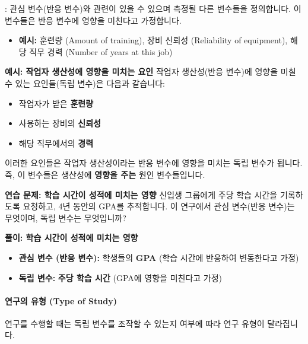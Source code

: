 \documentclass[11pt,a4paper]{article}
\begin{document}
\begin{tcolorbox}[mybox, title={연구 시작의 두 번째 단계: 독립 변수 정의 (Step Two in Initiating a Study)}]
: 관심 변수(반응 변수)와 관련이 있을 수 있으며 측정될 다른 변수들을 정의합니다. 이 변수들은 반응 변수에 영향을 미친다고 가정합니다.
\begin{itemize}
    \item \textbf{예시:} 훈련량 (Amount of training), 장비 신뢰성 (Reliability of equipment), 해당 직무 경력 (Number of years at this job)
\end{itemize}
\end{tcolorbox}

\begin{examplebox}
\textbf{예시: 작업자 생산성에 영향을 미치는 요인}
작업자 생산성(반응 변수)에 영향을 미칠 수 있는 요인들(독립 변수)은 다음과 같습니다:
\begin{itemize}
    \item 작업자가 받은 \textbf{훈련량}
    \item 사용하는 장비의 \textbf{신뢰성}
    \item 해당 직무에서의 \textbf{경력}
\end{itemize}
이러한 요인들은 작업자 생산성이라는 반응 변수에 영향을 미치는 독립 변수가 됩니다. 즉, 이 변수들은 생산성에 \textbf{영향을 주는} 원인 변수들입니다.
\end{examplebox}

\begin{practicebox}
\textbf{연습 문제: 학습 시간이 성적에 미치는 영향}
신입생 그룹에게 주당 학습 시간을 기록하도록 요청하고, 4년 동안의 GPA를 추적합니다.
이 연구에서 관심 변수(반응 변수)는 무엇이며, 독립 변수는 무엇입니까?
\end{practicebox}

\begin{solutionbox}
\textbf{풀이: 학습 시간이 성적에 미치는 영향}
\begin{itemize}
    \item \textbf{관심 변수 (반응 변수):} 학생들의 \textbf{GPA} (학습 시간에 반응하여 변동한다고 가정)
    \item \textbf{독립 변수:} \textbf{주당 학습 시간} (GPA에 영향을 미친다고 가정)
\end{itemize}
\end{solutionbox}

\paragraph{연구의 유형 (Type of Study)}
연구를 수행할 때는 독립 변수를 조작할 수 있는지 여부에 따라 연구 유형이 달라집니다.
\end{document}
